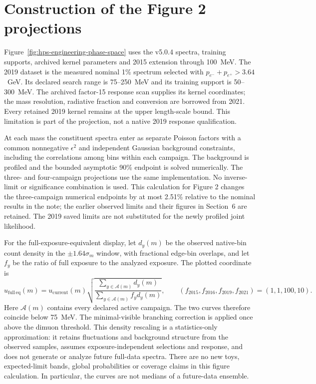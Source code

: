 
\section{Construction of the Figure 2 projections}
\label{app:figure2-projections}

Figure~\ref{fig:hps-engineering-phase-space} uses the v5.0.4 spectra,
training supports, archived kernel parameters and 2015 extension through
100~MeV. The 2019 dataset is the measured nominal 1\% spectrum selected with
$p_{e^-}+p_{e^+}>3.64$~GeV. Its declared search range is 75--250~MeV and its
training support is 50--300~MeV. The archived factor-15 response scan supplies
its kernel coordinates; the mass resolution, radiative fraction and conversion
are borrowed from 2021. Every retained 2019 kernel remains at the upper
length-scale bound. This limitation is part of the projection, not a native
2019 response qualification.

At each mass the constituent spectra enter as separate Poisson factors with
a common nonnegative $\epsilon^2$ and independent Gaussian background
constraints, including the correlations among bins within each campaign.
The background is profiled and the bounded asymptotic 90\% \CLs{} endpoint
is solved numerically. The three- and four-campaign projections use
the same implementation. No inverse-limit or significance combination is used.
This calculation for Figure 2 changes the three-campaign numerical endpoints
by at most 2.51\% relative to the nominal results in the note; the earlier observed
limits and their figures in Section~6 are retained. The 2019 saved limits
are not substituted for the newly profiled joint likelihood.

For the full-exposure-equivalent display, let $d_y(m)$ be the observed native-bin
count density in the $\pm1.64\sigma_m$ window, with fractional edge-bin overlaps,
and let $f_y$ be the ratio of full exposure to the analyzed exposure. The plotted
coordinate is
\begin{equation}
 u_{\mathrm{full\,eq}}(m)=u_{\mathrm{current}}(m)
 \sqrt{\frac{\sum_{y\in\mathcal A(m)}d_y(m)}
 {\sum_{y\in\mathcal A(m)} f_y d_y(m)}},
 \qquad (f_{2015},f_{2016},f_{2019},f_{2021})=(1,1,100,10).
\end{equation}
Here $\mathcal A(m)$ contains every declared active campaign. The two curves
therefore coincide below 75~MeV. The minimal-visible branching correction is
applied once above the dimuon threshold. This density rescaling is a
statistics-only approximation: it retains fluctuations and background
structure from the observed samples, assumes exposure-independent selections
and response, and does not generate or analyze future full-data spectra.
There are no new toys, expected-limit bands, global probabilities or coverage
claims in this figure calculation. In particular, the curves are not medians
of a future-data ensemble.

